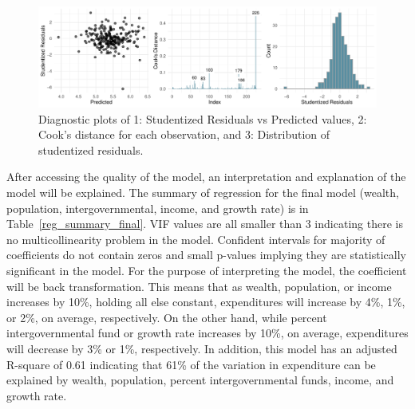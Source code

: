 \documentclass[11pt]{article}\usepackage[]{graphicx}\usepackage[]{color}
\makeatletter
\def\maxwidth{ %
  \ifdim\Gin@nat@width>\linewidth
    \linewidth
  \else
    \Gin@nat@width
  \fi
}
\makeatother
\begin{document}
\begin{figure}[h!] 
\begin{center}

\includegraphics[width=\maxwidth]{figure/unnamed-chunk-5-1} 

\caption{Diagnostic plots of 1: Studentized Residuals vs Predicted values, 2: Cook's distance for each observation, and 3: Distribution of studentized residuals.}
\label{diag-plot1}
\end{center} 
\end{figure}

\noindent After accessing the quality of the model, an interpretation and explanation of the model will be explained. The summary of regression for the final model (wealth, population, intergovernmental, income, and growth rate) is in Table~\ref{reg_summary_final}. VIF values are all smaller than 3 indicating there is no multicollinearity problem in the model. Confident intervals for majority of coefficients do not contain zeros and small p-values implying they are statistically significant in the model. For the purpose of interpreting the model, the coefficient will be back transformation. This means that as wealth, population, or income increases by 10\%, holding all else constant, expenditures will increase by 4\%, 1\%, or 2\%, on average, respectively. On the other hand, while percent intergovernmental fund or growth rate increases by 10\%, on average, expenditures will decrease by 3\% or 1\%, respectively. In addition, this model has an adjusted R-square of 0.61 indicating that 61\% of the variation in expenditure can be explained by wealth, population, percent intergovernmental funds, income, and growth rate.   
\end{document}

